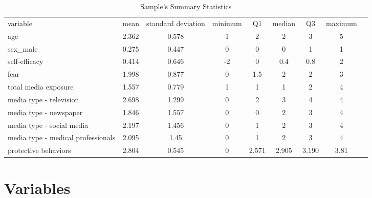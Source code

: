 \documentclass{article}
\begin{document}
\begin{table}[h]
\begin{tabular}{|l *{8}{|c}|}
	variable & mean & standard deviation & minimum & Q1 & median & Q3 & maximum \\
	age & 2.362 & 0.578 & 1 & 2 &2 & 3 & 5 \\
	sex\_male & 0.275 & 0.447 & 0 & 0 & 0 & 1 & 1 \\
	self-efficacy & 0.414 & 0.646 & -2 & 0 & 0.4 & 0.8 & 2 \\
	fear & 1.998  & 0.877  & 0 & 1.5 & 2 & 2 & 3 \\
	total media exposure & 1.557 & 0.779 & 1 & 1 & 1 & 2 & 4 \\
	media type - television & 2.698 & 1.299  & 0 & 2 & 3 & 4 & 4 \\
	media type - newspaper & 1.846 & 1.557 & 0 & 0 & 2 & 3 & 4 \\
	media type - social media & 2.197 & 1.456 & 0 & 1 & 2 & 3 & 4 \\
	media type - medical professionals & 2.095 & 1.45 & 0 & 1 & 2 & 3 & 4 \\
	protective behaviors & 2.804 & 0.545 & 0 & 2.571 & 2.905 & 3.190 & 3.81 \\

\end{tabular}
\caption{Sample's Summary Statistics}
\label{tbl:summstats}
\end{table}

\section{Variables}
\label{sec:variables}

\medskip
\printbibliography \label{bibliography}
\end{document}
